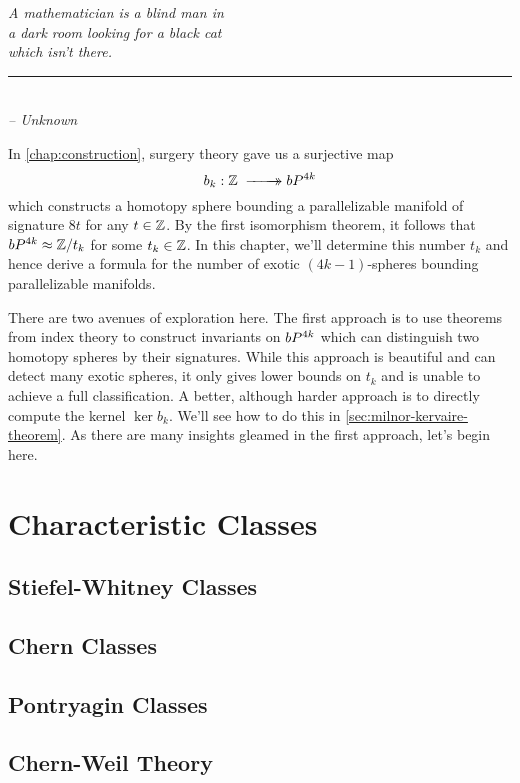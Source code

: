 \begin{flushleft}
	\textsl{A mathematician is a blind man in }\\
	\textsl{a dark room looking for a black cat}\\
	\textsl{which isn’t there.}\\
	\rule[0pt]{15em}{0.5pt}\\
	\textsl{-- Unknown}
	\vspace{2em}
\end{flushleft}

In \cref{chap:construction}, surgery theory gave us a surjective map
\[
		b_k : \Z \lkxsurj \bP^{4k}
\]
which constructs a homotopy sphere bounding a parallelizable manifold of signature $8t$ for any $t\in \mathbb{Z}$. By the first isomorphism theorem, it follows that $bP^{4k}\approx \mathbb{Z}/t_k$ for some $t_k\in \mathbb{Z}$. In this chapter, we'll determine this number $t_k$ and hence derive a formula for the number of exotic $(4k-1)$-spheres bounding parallelizable manifolds. 

There are two avenues of exploration here. The first approach is to use theorems from index theory to construct invariants on $bP^{4k}$ which can distinguish two homotopy spheres by their signatures. While this approach is beautiful and can detect many exotic spheres, it only gives lower bounds on $t_k$ and is unable to achieve a full classification. A better, although harder approach is to directly compute the kernel $\ker b_k$. We'll see how to do this in \cref{sec:milnor-kervaire-theorem}. As there are many insights gleamed in the first approach, let's begin here.

\section{Characteristic Classes}

\subsection{Stiefel-Whitney Classes}
\subsection{Chern Classes}
\subsection{Pontryagin Classes}

\subsection{Chern-Weil Theory}

